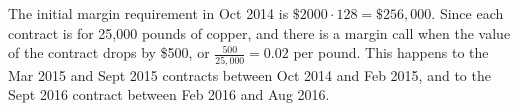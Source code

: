 \documentclass{article}
\begin{document}
\begin{itemize}
\begin{soln}
			The initial margin requirement in Oct 2014 is $\$2000\cdot128=\$256, 000.$ Since each contract is for 25,000 pounds of copper, and there is a margin call when the value of the contract drops by \$500, or $\frac{500}{25, 000} = 0.02$ per pound. This happens to the Mar 2015 and Sept 2015 contracts between Oct 2014 and Feb 2015, and to the Sept 2016 contract between Feb 2016 and Aug 2016.
		\end{soln}
		
\end{itemize}
\end{document}
